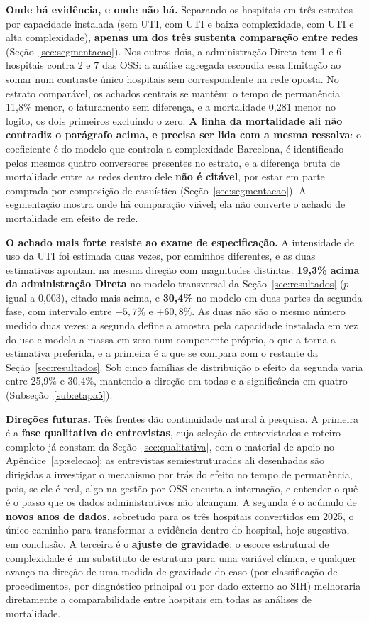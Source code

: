 \textbf{Onde há evidência, e onde não há.} Separando os hospitais em três
estratos por capacidade instalada (sem UTI, com UTI e baixa complexidade,
com UTI e alta complexidade), \textbf{apenas um dos três sustenta comparação
entre redes} (Seção~\ref{sec:segmentacao}). Nos outros dois, a administração
Direta tem 1 e 6 hospitais contra 2 e 7 das OSS: a análise agregada
escondia essa limitação ao somar num contraste único hospitais sem
correspondente na rede oposta. No estrato comparável, os achados centrais se
mantêm: o tempo de permanência 11,8\% menor, o faturamento sem diferença,
e a mortalidade 0,281 menor no logito, os dois primeiros excluindo o zero.
\textbf{A linha da mortalidade ali não contradiz o parágrafo acima, e
precisa ser lida com a mesma ressalva}: o coeficiente é do modelo que
controla a complexidade Barcelona, é identificado pelos mesmos quatro
conversores presentes no estrato, e a diferença bruta de mortalidade entre
as redes dentro dele \textbf{não é citável}, por estar em parte comprada
por composição de casuística (Seção~\ref{sec:segmentacao}). A segmentação
mostra onde há comparação viável; ela não converte o achado de mortalidade
em efeito de rede.

\textbf{O achado mais forte resiste ao exame de especificação.} A
intensidade de uso da UTI foi estimada duas vezes, por caminhos
diferentes, e as duas estimativas apontam na mesma direção com magnitudes
distintas: \textbf{19,3\% acima da administração Direta} no modelo
transversal da Seção~\ref{sec:resultados} ($p$ igual a 0,003), citado mais
acima, e \textbf{30,4\%} no modelo em duas partes da segunda fase, com
intervalo entre $+5{,}7\%$ e $+60{,}8\%$. As duas não são o mesmo número
medido duas vezes: a segunda define a amostra pela capacidade instalada em
vez do uso e modela a massa em zero num componente próprio, o que a torna
a estimativa preferida, e a primeira é a que se compara com o restante da
Seção~\ref{sec:resultados}. Sob cinco famílias de distribuição o efeito da
segunda varia entre 25,9\% e 30,4\%, mantendo a direção em todas e a
significância em quatro (Subseção~\ref{sub:etapa5}).

\newpage
\textbf{Direções futuras.} Três frentes dão continuidade natural à
pesquisa. A primeira é a \textbf{fase qualitativa de entrevistas}, cuja
seleção de entrevistados e roteiro completo já constam da
Seção~\ref{sec:qualitativa}, com o material de apoio no
Apêndice~\ref{ap:selecao}: as entrevistas semiestruturadas ali
desenhadas são dirigidas a investigar o mecanismo por trás do efeito no
tempo de permanência, pois, se ele é real, algo na gestão por OSS
encurta a internação, e entender o quê é o passo que os dados
administrativos não alcançam. A segunda é o acúmulo de \textbf{novos
anos de dados}, sobretudo para os três hospitais convertidos em 2025, o
único caminho para transformar a evidência dentro do hospital, hoje
sugestiva, em conclusão. A terceira é o \textbf{ajuste de gravidade}:
o escore estrutural de complexidade é um substituto de estrutura para
uma variável clínica, e qualquer avanço na direção de uma medida de
gravidade do caso (por classificação de procedimentos, por
diagnóstico principal ou por dado externo ao SIH) melhoraria
diretamente a comparabilidade entre hospitais em todas as análises de
mortalidade.

